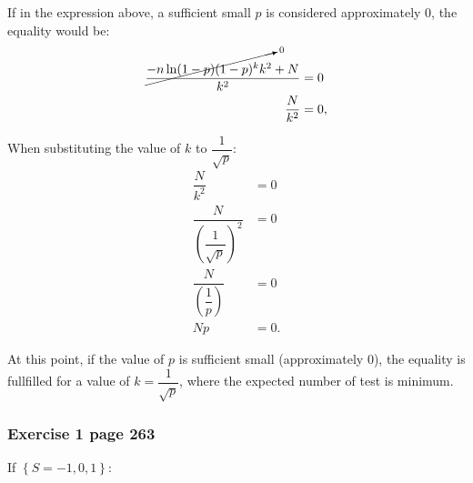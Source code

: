 \documentclass[10pt,leter,openany]{article}
\begin{document}
\begin{enumerate}[(a)]
If in the expression above, a sufficient small $p$ is considered approximately 0, the equality would be:
\begin{equation*}
	\begin{aligned}
		\dfrac{\cancelto{0}{-n\ln(1-p)(1-p)^k k^2}+N}{k^2}& = 0\\
		\dfrac{N}{k^2}&=0,
	\end{aligned}	
\end{equation*}

When substituting the value of $ k $ to $\dfrac{1}{\sqrt{p}}$:
\begin{equation*}
	\begin{aligned}
		\dfrac{N}{k^2}& = 0\\
		\dfrac{N}{\left( \dfrac{1}{\sqrt{p}}\right) ^2}&=0\\
		\dfrac{N}{\left( \dfrac{1}{p}\right) } & =0\\
		Np & =0.
	\end{aligned}	
\end{equation*}

At this point, if the value of $p$ is sufficient small (approximately 0), the equality is fullfilled for a value of $k=\dfrac{1}{\sqrt{p}} $, where the expected number of test is minimum.

\end{enumerate}

\subsubsection*{Exercise 1 page 263}

If $\left\lbrace S=-1,0,1\right\rbrace :$
\end{document}
